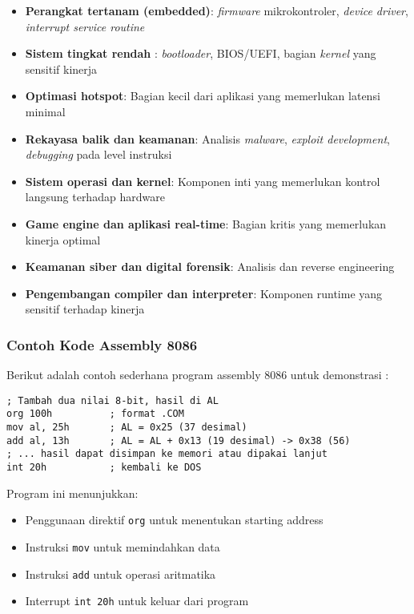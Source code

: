 \documentclass[../main.tex]{subfiles}
\begin{document}
\begin{itemize}
    \item \textbf{Perangkat tertanam (embedded)}: \textit{firmware} mikrokontroler, \textit{device driver}, \textit{interrupt service routine}
    \item \textbf{Sistem tingkat rendah }: \textit{bootloader}, BIOS/UEFI, bagian \textit{kernel} yang sensitif kinerja
    \item \textbf{Optimasi hotspot}: Bagian kecil dari aplikasi yang memerlukan latensi minimal
    \item \textbf{Rekayasa balik dan keamanan}: Analisis \textit{malware}, \textit{exploit development}, \textit{debugging} pada level instruksi
    \item \textbf{Sistem operasi dan kernel}: Komponen inti yang memerlukan kontrol langsung terhadap hardware
    \item \textbf{Game engine dan aplikasi real-time}: Bagian kritis yang memerlukan kinerja optimal
    \item \textbf{Keamanan siber dan digital forensik}: Analisis dan reverse engineering
    \item \textbf{Pengembangan compiler dan interpreter}: Komponen runtime yang sensitif terhadap kinerja
\end{itemize}

\subsubsection{Contoh Kode Assembly 8086}
Berikut adalah contoh sederhana program assembly 8086 untuk demonstrasi \cite{susanto1995belajar}:

\begin{lstlisting}[language={[x86masm]Assembler}, caption={Cuplikan 8086 (ilustratif)}, label={lst:assembly_example}]
; Tambah dua nilai 8-bit, hasil di AL
org 100h          ; format .COM
mov al, 25h       ; AL = 0x25 (37 desimal)
add al, 13h       ; AL = AL + 0x13 (19 desimal) -> 0x38 (56)
; ... hasil dapat disimpan ke memori atau dipakai lanjut
int 20h           ; kembali ke DOS
\end{lstlisting}

Program ini menunjukkan:
\begin{itemize}
    \item Penggunaan direktif \texttt{org} untuk menentukan starting address
    \item Instruksi \texttt{mov} untuk memindahkan data
    \item Instruksi \texttt{add} untuk operasi aritmatika
    \item Interrupt \texttt{int 20h} untuk keluar dari program
\end{itemize}
\end{document}
